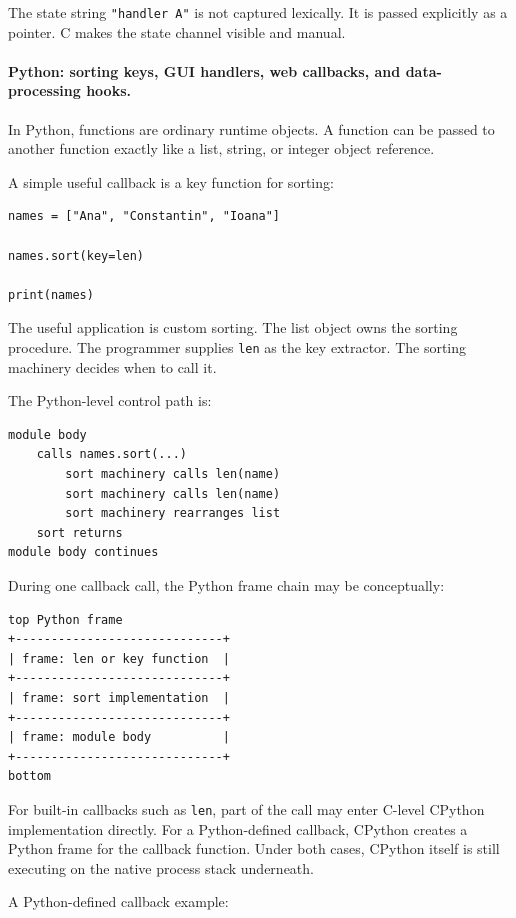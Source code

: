 \documentclass[a4paper,twoside]{report}
\begin{document}
The state string \texttt{"handler A"} is not captured lexically. It is passed explicitly as a pointer. C makes the state channel visible and manual.

\paragraph{Python: sorting keys, GUI handlers, web callbacks, and data-processing hooks.}

In Python, functions are ordinary runtime objects. A function can be passed to another function exactly like a list, string, or integer object reference.

A simple useful callback is a key function for sorting:

\begin{verbatim}
names = ["Ana", "Constantin", "Ioana"]

names.sort(key=len)

print(names)
\end{verbatim}

The useful application is custom sorting. The list object owns the sorting procedure. The programmer supplies \texttt{len} as the key extractor. The sorting machinery decides when to call it.

The Python-level control path is:

\begin{verbatim}
module body
    calls names.sort(...)
        sort machinery calls len(name)
        sort machinery calls len(name)
        sort machinery rearranges list
    sort returns
module body continues
\end{verbatim}

During one callback call, the Python frame chain may be conceptually:

\begin{verbatim}
top Python frame
+-----------------------------+
| frame: len or key function  |
+-----------------------------+
| frame: sort implementation  |
+-----------------------------+
| frame: module body          |
+-----------------------------+
bottom
\end{verbatim}

For built-in callbacks such as \texttt{len}, part of the call may enter C-level CPython implementation directly. For a Python-defined callback, CPython creates a Python frame for the callback function. Under both cases, CPython itself is still executing on the native process stack underneath.

A Python-defined callback example:
\end{document}
